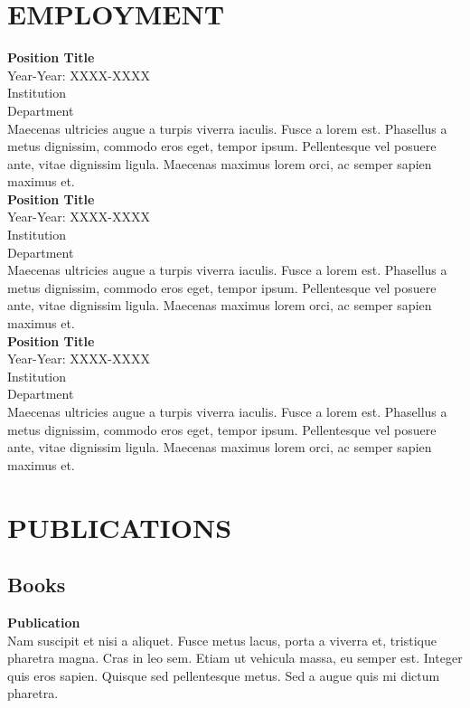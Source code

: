\documentclass{article}
\begin{document}

\section*{EMPLOYMENT}
\noindent
\newline
\textbf{Position Title} \\
Year-Year: XXXX-XXXX \\
Institution \\ 
Department \\
Maecenas ultricies augue a turpis viverra iaculis. Fusce a lorem est. Phasellus a metus dignissim, commodo eros eget, tempor ipsum. Pellentesque vel posuere ante, vitae dignissim ligula. Maecenas maximus lorem orci, ac semper sapien maximus et. \\ 

\noindent
\textbf{Position Title} \\
Year-Year: XXXX-XXXX \\
Institution \\ 
Department \\
Maecenas ultricies augue a turpis viverra iaculis. Fusce a lorem est. Phasellus a metus dignissim, commodo eros eget, tempor ipsum. Pellentesque vel posuere ante, vitae dignissim ligula. Maecenas maximus lorem orci, ac semper sapien maximus et. \\

\noindent
\textbf{Position Title} \\
Year-Year: XXXX-XXXX \\
Institution \\ 
Department \\
Maecenas ultricies augue a turpis viverra iaculis. Fusce a lorem est. Phasellus a metus dignissim, commodo eros eget, tempor ipsum. Pellentesque vel posuere ante, vitae dignissim ligula. Maecenas maximus lorem orci, ac semper sapien maximus et. 


\section*{PUBLICATIONS}
 
\subsection*{Books}
\textbf{Publication} \\ 
Nam suscipit et nisi a aliquet. Fusce metus lacus, porta a viverra et, tristique pharetra magna. Cras in leo sem. Etiam ut vehicula massa, eu semper est. Integer quis eros sapien. Quisque sed pellentesque metus. Sed a augue quis mi dictum pharetra. 
\end{document}
